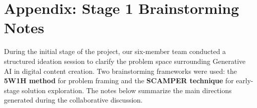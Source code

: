 

















\newpage
\section*{Appendix: Stage 1 Brainstorming Notes}

During the initial stage of the project, our six-member team conducted a structured ideation session to clarify the problem space surrounding Generative AI in digital content creation. Two brainstorming frameworks were used: the \textbf{5W1H method} for problem framing and the \textbf{SCAMPER technique} for early-stage solution exploration. The notes below summarize the main directions generated during the collaborative discussion.

